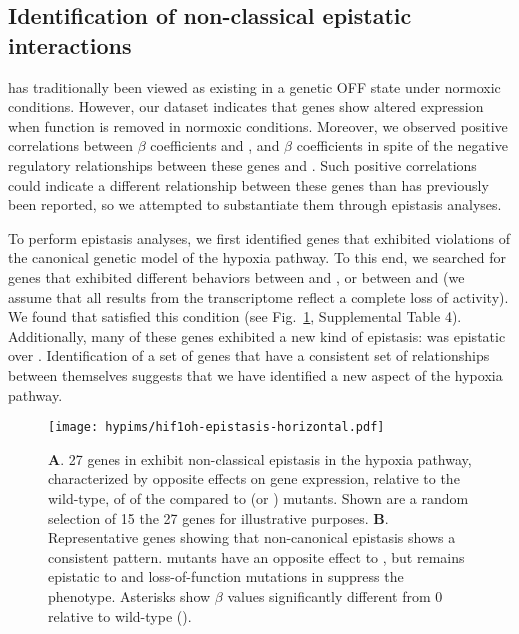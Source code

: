\subsection*{Identification of non-classical epistatic interactions}
\label{sub:hifoh}
\hif{} has traditionally been viewed as existing in a genetic OFF state under
normoxic conditions. However, our dataset indicates that \hifn{} genes show
altered expression when  function is removed in normoxic conditions.
Moreover, we observed positive correlations between \hif{} $\beta$ coefficients
and \egl{}, \vhl{} and \rhy{} $\beta$ coefficients in spite of the negative
regulatory relationships between these genes and . Such
positive correlations could indicate a different relationship between these genes
than has previously been reported, so we attempted to substantiate them through
epistasis analyses.

To perform epistasis analyses, we first identified genes that exhibited violations
of the canonical genetic model of the hypoxia pathway. To this end, we searched for
genes that exhibited different behaviors between \egl{} and \vhl{}, or
between \rhy{} and \vhl{} (we assume that all results from the
\rhy{} transcriptome reflect a complete loss of  activity). We found
\hifohtargets{} that satisfied this condition (see Fig.~\ref{fig:hif1oh},
Supplemental Table 4).
Additionally, many of these genes exhibited a new kind of epistasis:
 was epistatic over . Identification of a set of genes
that have a consistent set of relationships between themselves suggests that
we have identified a new aspect of the hypoxia pathway.

\begin{figure}[tbhp]
\centering
\texttt{[image: hypims/hif1oh-epistasis-horizontal.pdf]}
\caption{
\textbf{A}. 27 genes in \cel{} exhibit non-classical epistasis in the hypoxia
pathway, characterized by opposite effects on gene expression, relative to the
wild-type, of of the \vhl{} compared to \egl{} (or
\rhy{}) mutants. Shown are a random selection of 15 the 27 genes for illustrative
purposes.
\textbf{B}. Representative genes showing that non-canonical epistasis shows a
consistent pattern. \vhl{} mutants have an opposite effect to \egl{}, but
 remains epistatic to  and loss-of-function mutations in
 suppress the \egl{} phenotype. Asterisks show $\beta$ values
significantly different from 0 relative to wild-type ().
}
\label{fig:hif1oh}
\end{figure}

